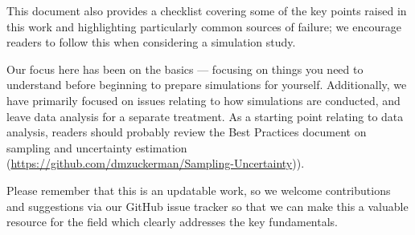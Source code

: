 \documentclass[9pt,bestpractices]{livecoms}
\begin{document}
This document also provides a checklist covering some of the key points raised in this work and highlighting particularly common sources of failure; we encourage readers to follow this when considering a simulation study.

Our focus here has been on the basics --- focusing on things you need to understand before beginning to prepare simulations for yourself.
Additionally, we have primarily focused on issues relating to how simulations are conducted, and leave data analysis for a separate treatment.
As a starting point relating to data analysis, readers should probably review the Best Practices document on sampling and uncertainty estimation (\url{https://github.com/dmzuckerman/Sampling-Uncertainty})).

Please remember that this is an updatable work, so we welcome contributions and suggestions via our GitHub issue tracker so that we can make this a valuable resource for the field which clearly addresses the key fundamentals.



\nocite{*}
{}
\end{document}
